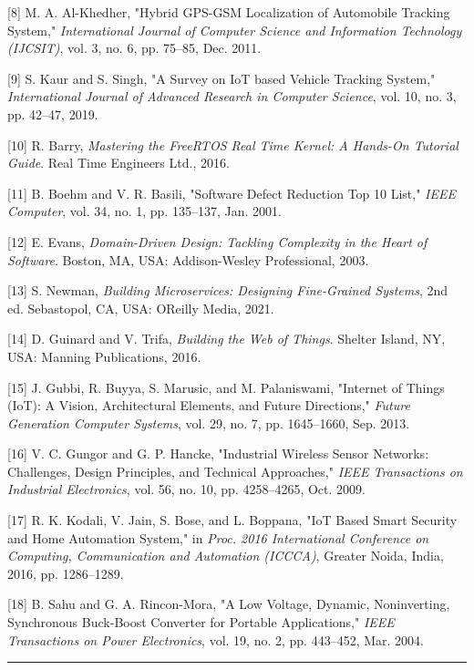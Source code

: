 \documentclass[a4paper]{extarticle}
\begin{document}
{[}8{]} M. A. Al-Khedher, "Hybrid GPS-GSM Localization of Automobile
Tracking System," \emph{International Journal of Computer Science and
Information Technology (IJCSIT)}, vol. 3, no. 6, pp. 75--85, Dec. 2011.

{[}9{]} S. Kaur and S. Singh, "A Survey on IoT based Vehicle Tracking
System," \emph{International Journal of Advanced Research in Computer
Science}, vol. 10, no. 3, pp. 42--47, 2019.

{[}10{]} R. Barry, \emph{Mastering the FreeRTOS Real Time Kernel: A
Hands-On Tutorial Guide}. Real Time Engineers Ltd., 2016.

{[}11{]} B. Boehm and V. R. Basili, "Software Defect Reduction Top 10
List," \emph{IEEE Computer}, vol. 34, no. 1, pp. 135--137, Jan. 2001.

{[}12{]} E. Evans, \emph{Domain-Driven Design: Tackling Complexity in
the Heart of Software}. Boston, MA, USA: Addison-Wesley Professional,
2003.

{[}13{]} S. Newman, \emph{Building Microservices: Designing Fine-Grained
Systems}, 2nd ed. Sebastopol, CA, USA: O\textquotesingle Reilly Media,
2021.

{[}14{]} D. Guinard and V. Trifa, \emph{Building the Web of Things}.
Shelter Island, NY, USA: Manning Publications, 2016.

{[}15{]} J. Gubbi, R. Buyya, S. Marusic, and M. Palaniswami, "Internet
of Things (IoT): A Vision, Architectural Elements, and Future
Directions," \emph{Future Generation Computer Systems}, vol. 29, no. 7,
pp. 1645--1660, Sep. 2013.

{[}16{]} V. C. Gungor and G. P. Hancke, "Industrial Wireless Sensor
Networks: Challenges, Design Principles, and Technical Approaches,"
\emph{IEEE Transactions on Industrial Electronics}, vol. 56, no. 10, pp.
4258--4265, Oct. 2009.

{[}17{]} R. K. Kodali, V. Jain, S. Bose, and L. Boppana, "IoT Based
Smart Security and Home Automation System," in \emph{Proc. 2016
International Conference on Computing, Communication and Automation
(ICCCA)}, Greater Noida, India, 2016, pp. 1286--1289.

{[}18{]} B. Sahu and G. A. Rincon-Mora, "A Low Voltage, Dynamic,
Noninverting, Synchronous Buck-Boost Converter for Portable
Applications," \emph{IEEE Transactions on Power Electronics}, vol. 19,
no. 2, pp. 443--452, Mar. 2004.

\begin{center}\rule{0.5\linewidth}{0.5pt}\end{center}
\end{document}
